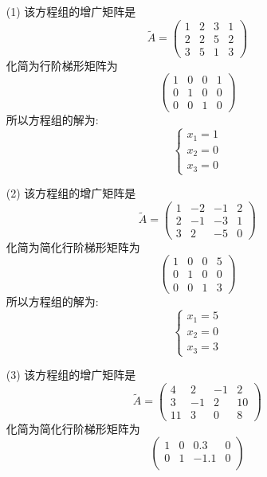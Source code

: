 \documentclass{article}
\begin{document}
\begin{itemize}
    \item[(1)]
    该方程组的增广矩阵是
    $$\tilde{A} = \begin{pmatrix}
        1 & 2 & 3 & 1 \\
        2 & 2 & 5 & 2 \\
        3 & 5 & 1 & 3
    \end{pmatrix}
    $$
    化简为行阶梯形矩阵为
    $$
    \begin{pmatrix}
        1 & 0 & 0 & 1 \\
        0 & 1 & 0 & 0 \\
        0 & 0 & 1 & 0
    \end{pmatrix}
    $$
    所以方程组的解为:
    $$
    \begin{cases} 
        x_1 = 1 \\
        x_2 = 0 \\
        x_3 = 0
    \end{cases}
    $$
    \item[(2)]
    该方程组的增广矩阵是
    $$\tilde{A} = \begin{pmatrix}
        1 & -2 & -1 & 2 \\
        2 & -1 & -3 & 1 \\
        3 & 2 & -5 & 0
    \end{pmatrix}
    $$
    化简为简化行阶梯形矩阵为
    $$
    \begin{pmatrix}
        1 & 0 & 0 & 5 \\
        0 & 1 & 0 & 0 \\
        0 & 0 & 1 & 3
    \end{pmatrix}
    $$
    所以方程组的解为:
    $$
    \begin{cases} 
        x_1 = 5 \\
        x_2 = 0 \\
        x_3 = 3
    \end{cases}
    $$
    \item[(3)]
    该方程组的增广矩阵是
    $$\tilde{A} = \begin{pmatrix}
        4 & 2 & -1 & 2 \\
        3 & -1 & 2 & 10 \\
        11 & 3 & 0 & 8
    \end{pmatrix}    
    $$
    化简为简化行阶梯形矩阵为
    $$
    \begin{pmatrix}
        1 & 0 & 0.3 & 0 \\
        0 & 1 & -1.1 & 0 \\

\end{pmatrix}$$
\end{itemize}
\end{document}
